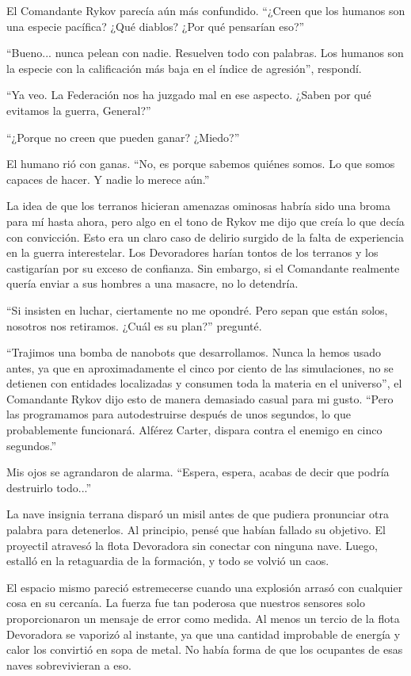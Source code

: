\documentclass[spanish,12pt,a4paper,oneside,titlepage]{book}
\begin{document}
    El Comandante Rykov parecía aún más confundido. ``¿Creen que los humanos son una especie pacífica? ¿Qué diablos? ¿Por qué pensarían eso?''

    ``Bueno... nunca pelean con nadie. Resuelven todo con palabras. Los humanos son la especie con la calificación más baja en el índice de agresión'', respondí.

    ``Ya veo. La Federación nos ha juzgado mal en ese aspecto. ¿Saben por qué evitamos la guerra, General?''

    ``¿Porque no creen que pueden ganar? ¿Miedo?''

    El humano rió con ganas. ``No, es porque sabemos quiénes somos. Lo que somos capaces de hacer. Y nadie lo merece aún.''

    La idea de que los terranos hicieran amenazas ominosas habría sido una broma para mí hasta ahora, pero algo en el tono de Rykov me dijo que creía lo que decía con convicción. Esto era un claro caso de delirio surgido de la falta de experiencia en la guerra interestelar. Los Devoradores harían tontos de los terranos y los castigarían por su exceso de confianza. Sin embargo, si el Comandante realmente quería enviar a sus hombres a una masacre, no lo detendría.

    ``Si insisten en luchar, ciertamente no me opondré. Pero sepan que están solos, nosotros nos retiramos. ¿Cuál es su plan?'' pregunté.

    ``Trajimos una bomba de nanobots que desarrollamos. Nunca la hemos usado antes, ya que en aproximadamente el cinco por ciento de las simulaciones, no se detienen con entidades localizadas y consumen toda la materia en el universo'', el Comandante Rykov dijo esto de manera demasiado casual para mi gusto. ``Pero las programamos para autodestruirse después de unos segundos, lo que probablemente funcionará. Alférez Carter, dispara contra el enemigo en cinco segundos.''

    Mis ojos se agrandaron de alarma. ``Espera, espera, acabas de decir que podría destruirlo todo...''

    La nave insignia terrana disparó un misil antes de que pudiera pronunciar otra palabra para detenerlos. Al principio, pensé que habían fallado su objetivo. El proyectil atravesó la flota Devoradora sin conectar con ninguna nave. Luego, estalló en la retaguardia de la formación, y todo se volvió un caos.

    El espacio mismo pareció estremecerse cuando una explosión arrasó con cualquier cosa en su cercanía. La fuerza fue tan poderosa que nuestros sensores solo proporcionaron un mensaje de error como medida. Al menos un tercio de la flota Devoradora se vaporizó al instante, ya que una cantidad improbable de energía y calor los convirtió en sopa de metal. No había forma de que los ocupantes de esas naves sobrevivieran a eso.
\end{document}
